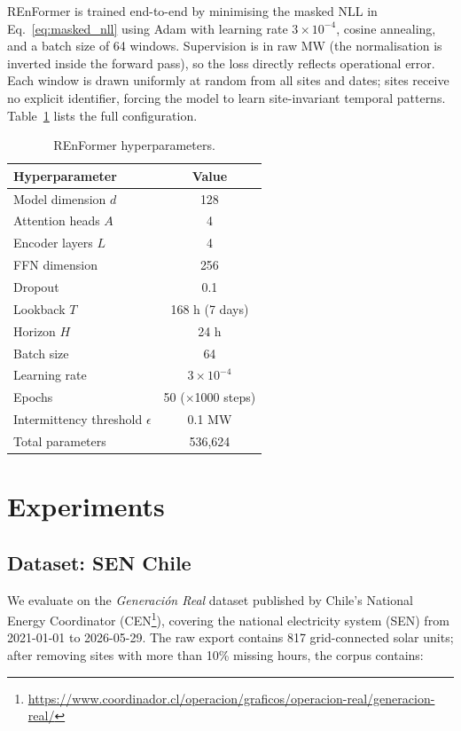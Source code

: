 \documentclass[10pt,twocolumn]{article}
\begin{document}
REnFormer is trained end-to-end by minimising the masked NLL in
Eq.~\eqref{eq:masked_nll} using Adam with learning rate $3 \times 10^{-4}$,
cosine annealing, and a batch size of 64 windows. Supervision is in raw
MW (the normalisation is inverted inside the forward pass), so the loss
directly reflects operational error. Each window is drawn uniformly at
random from all sites and dates; sites receive no explicit identifier,
forcing the model to learn site-invariant temporal patterns.
Table~\ref{tab:hparams} lists the full configuration.

\begin{table}[h]
  \centering
  \caption{REnFormer hyperparameters.}
  \label{tab:hparams}
  \begin{tabular}{lc}
    \toprule
    Hyperparameter & Value \\
    \midrule
    Model dimension $d$ & 128 \\
    Attention heads $A$ & 4 \\
    Encoder layers $L$ & 4 \\
    FFN dimension & 256 \\
    Dropout & 0.1 \\
    Lookback $T$ & 168 h (7 days) \\
    Horizon $H$ & 24 h \\
    Batch size & 64 \\
    Learning rate & $3 \times 10^{-4}$ \\
    Epochs & 50 ($\times$1000 steps) \\
    Intermittency threshold $\epsilon$ & 0.1 MW \\
    \midrule
    Total parameters & 536,624 \\
    \bottomrule
  \end{tabular}
\end{table}

\section{Experiments}

\subsection{Dataset: SEN Chile}

We evaluate on the \emph{Generaci\'on Real} dataset published by
Chile's National Energy Coordinator (CEN\footnote{\url{https://www.coordinador.cl/operacion/graficos/operacion-real/generacion-real/}}), covering the national
electricity system (SEN) from 2021-01-01 to 2026-05-29. The raw export
contains 817 grid-connected solar units; after removing sites with more
than 10\% missing hours, the corpus contains:
\end{document}

